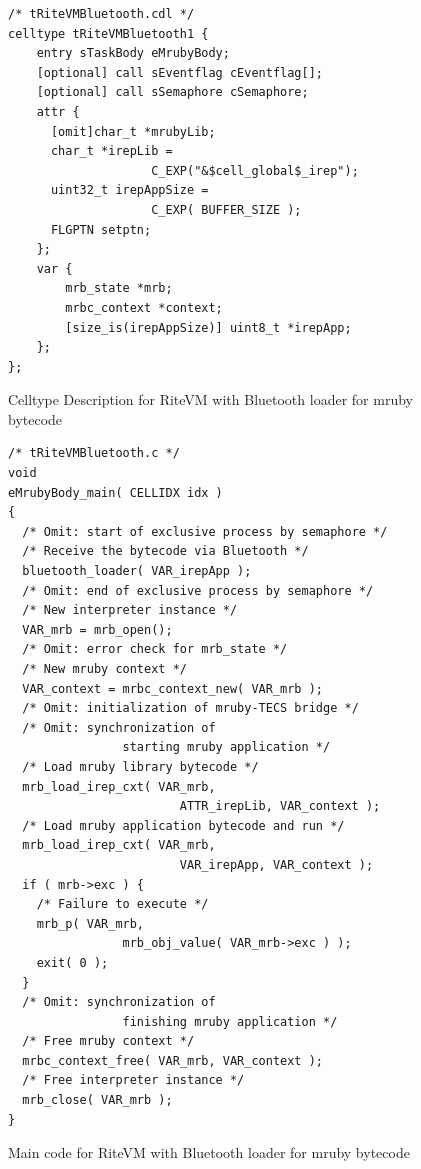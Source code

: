 \documentclass{sig-alternate-05-2015}
\begin{document}
\begin{figure}[t]
\centering
\begin{lstlisting}
/* tRiteVMBluetooth.cdl */
celltype tRiteVMBluetooth1 {
    entry sTaskBody eMrubyBody;
    [optional] call sEventflag cEventflag[];
    [optional] call sSemaphore cSemaphore;
    attr {
      [omit]char_t *mrubyLib;
      char_t *irepLib = 
                    C_EXP("&$cell_global$_irep");
      uint32_t irepAppSize = 
                    C_EXP( BUFFER_SIZE );
      FLGPTN setptn;
    };
    var {
        mrb_state *mrb;
        mrbc_context *context;
        [size_is(irepAppSize)] uint8_t *irepApp;
    };
};
\end{lstlisting}
\vspace{1mm}
\caption{Celltype Description for RiteVM with Bluetooth loader for mruby bytecode}
\vspace{1mm}
\label{celltype_mrubybluetooth}
\end{figure}

\begin{figure}[t]
\centering
\begin{lstlisting}
/* tRiteVMBluetooth.c */
void
eMrubyBody_main( CELLIDX idx )
{
  /* Omit: start of exclusive process by semaphore */
  /* Receive the bytecode via Bluetooth */
  bluetooth_loader( VAR_irepApp );
  /* Omit: end of exclusive process by semaphore */
  /* New interpreter instance */
  VAR_mrb = mrb_open();
  /* Omit: error check for mrb_state */
  /* New mruby context */
  VAR_context = mrbc_context_new( VAR_mrb );
  /* Omit: initialization of mruby-TECS bridge */
  /* Omit: synchronization of
                starting mruby application */
  /* Load mruby library bytecode */
  mrb_load_irep_cxt( VAR_mrb,
                        ATTR_irepLib, VAR_context );
  /* Load mruby application bytecode and run */
  mrb_load_irep_cxt( VAR_mrb,
                        VAR_irepApp, VAR_context );
  if ( mrb->exc ) {
    /* Failure to execute */
    mrb_p( VAR_mrb, 
                mrb_obj_value( VAR_mrb->exc ) );
    exit( 0 );
  }
  /* Omit: synchronization of
                finishing mruby application */
  /* Free mruby context */
  mrbc_context_free( VAR_mrb, VAR_context );
  /* Free interpreter instance */
  mrb_close( VAR_mrb );
}

\end{lstlisting}
\vspace{1mm}
\caption{Main code for RiteVM with Bluetooth loader for mruby bytecode}
\vspace{1mm}
\label{maincode_mrubybluetooth}
\end{figure}
\end{document}
